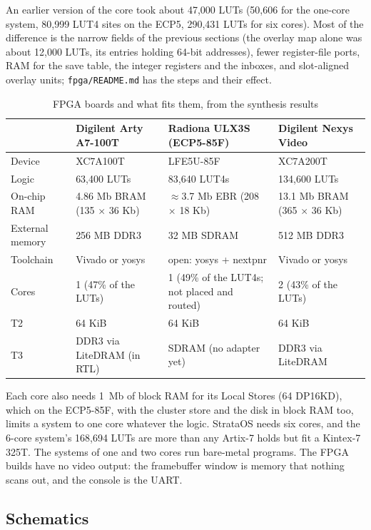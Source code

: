 An earlier version of the core took about 47,000 LUTs (50,606 for the one-core system, 80,999 LUT4
sites on the ECP5, 290,431 LUTs for six cores). Most of the difference is the narrow fields of the
previous sections (the overlay map alone was about 12,000 LUTs, its entries holding 64-bit addresses),
fewer register-file ports, RAM for the save table, the integer registers and the inboxes, and
slot-aligned overlay units;
\texttt{fpga/README.md} has the steps and their effect.

\begin{table}[htbp]
\centering\small
\caption{FPGA boards and what fits them, from the synthesis results}\label{tab:fpga}
\begin{tabularx}{\linewidth}{@{}l X X X@{}}
\toprule
 & \textbf{Digilent Arty A7-100T} & \textbf{Radiona ULX3S (ECP5-85F)} & \textbf{Digilent Nexys Video}\\\midrule
Device & XC7A100T & LFE5U-85F & XC7A200T\\
Logic & 63,400 LUTs & 83,640 LUT4s & 134,600 LUTs\\
On-chip RAM & 4.86 Mb BRAM (135 $\times$ 36 Kb) & $\approx$3.7 Mb EBR (208 $\times$ 18 Kb) & 13.1 Mb BRAM (365 $\times$ 36 Kb)\\
External memory & 256 MB DDR3 & 32 MB SDRAM & 512 MB DDR3\\
Toolchain & Vivado or yosys & open: yosys + nextpnr & Vivado or yosys\\
Cores & 1 (47\% of the LUTs) & 1 (49\% of the LUT4s; not placed and routed) & 2 (43\% of the LUTs)\\
T2 & 64 KiB & 64 KiB & 64 KiB\\
T3 & DDR3 via LiteDRAM (in RTL) & SDRAM (no adapter yet) & DDR3 via LiteDRAM\\
\bottomrule
\end{tabularx}
\end{table}

Each core also needs 1~Mb of block RAM for its Local Stores (64 DP16KD), which on the ECP5-85F, with
the cluster store and the disk in block RAM too, limits a system to one core whatever the logic. StrataOS needs six cores, and the 6-core system's 168,694 LUTs are more than
any Artix-7 holds but fit a Kintex-7 325T. The systems of one and two cores run bare-metal programs.
The FPGA builds have no video output: the framebuffer window is memory that nothing scans out, and the
console is the UART.

\subsection{Schematics}

